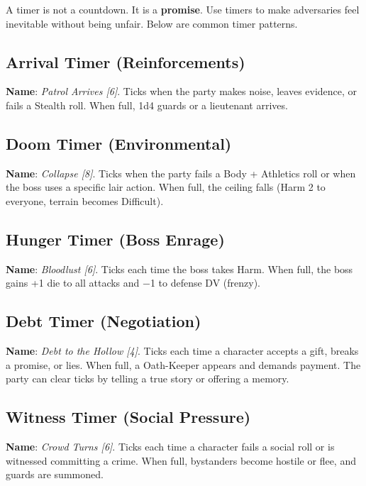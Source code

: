\noindent A timer is not a countdown. It is a \textbf{promise}. Use timers to make adversaries feel inevitable without being unfair. Below are common timer patterns.

\subsection*{Arrival Timer (Reinforcements)}
\noindent\textbf{Name}: \emph{Patrol Arrives [6]}. Ticks when the party makes noise, leaves evidence, or fails a Stealth roll. When full, 1d4 guards or a lieutenant arrives.

\subsection*{Doom Timer (Environmental)}
\noindent\textbf{Name}: \emph{Collapse [8]}. Ticks when the party fails a Body + Athletics roll or when the boss uses a specific lair action. When full, the ceiling falls (Harm 2 to everyone, terrain becomes Difficult).

\subsection*{Hunger Timer (Boss Enrage)}
\noindent\textbf{Name}: \emph{Bloodlust [6]}. Ticks each time the boss takes Harm. When full, the boss gains +1 die to all attacks and −1 to defense DV (frenzy).

\subsection*{Debt Timer (Negotiation)}
\noindent\textbf{Name}: \emph{Debt to the Hollow [4]}. Ticks each time a character accepts a gift, breaks a promise, or lies. When full, a Oath-Keeper appears and demands payment. The party can clear ticks by telling a true story or offering a memory.

\subsection*{Witness Timer (Social Pressure)}
\noindent\textbf{Name}: \emph{Crowd Turns [6]}. Ticks each time a character fails a social roll or is witnessed committing a crime. When full, bystanders become hostile or flee, and guards are summoned.


